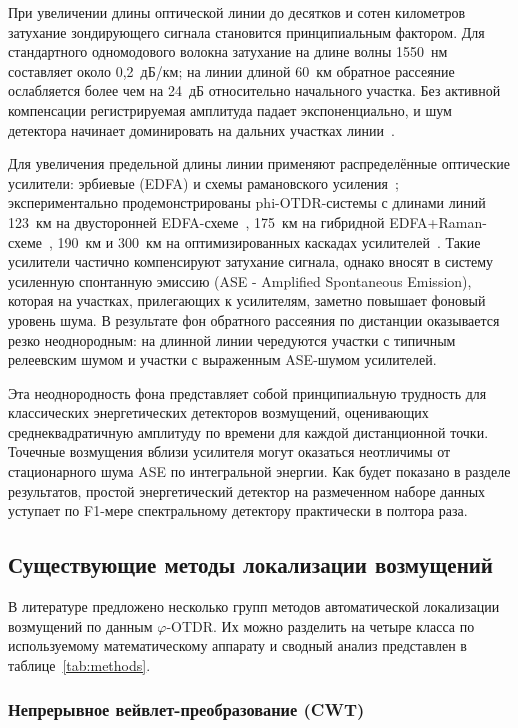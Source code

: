 \documentclass[12pt,a4paper]{extarticle}
\newcommand{\phiOTDR}{$\varphi$-OTDR}
\begin{document}
При увеличении длины оптической линии до десятков и сотен километров затухание зондирующего сигнала становится принципиальным фактором. Для стандартного одномодового волокна затухание на длине волны 1550~нм составляет около 0{,}2~дБ/км; на линии длиной 60~км обратное рассеяние ослабляется более чем на 24~дБ относительно начального участка. Без активной компенсации регистрируемая амплитуда падает экспоненциально, и шум детектора начинает доминировать на дальних участках линии~\cite{Peng2014, WangZN2014}.

Для увеличения предельной длины линии применяют распределённые оптические усилители: эрбиевые (EDFA) и схемы рамановского усиления~\cite{Martins2014, Wang2016}; экспериментально продемонстрированы phi-OTDR-системы с длинами линий 123~км на двусторонней EDFA-схеме~\cite{Tian2016}, 175~км на гибридной EDFA+Raman-схеме~\cite{WangZN2014}, 190~км и 300~км на оптимизированных каскадах усилителей~\cite{Wang2023, Fan2023}. Такие усилители частично компенсируют затухание сигнала, однако вносят в систему усиленную спонтанную эмиссию (ASE - Amplified Spontaneous Emission), которая на участках, прилегающих к усилителям, заметно повышает фоновый уровень шума. В результате фон обратного рассеяния по дистанции оказывается резко неоднородным: на длинной линии чередуются участки с типичным релеевским шумом и участки с выраженным ASE-шумом усилителей.

Эта неоднородность фона представляет собой принципиальную трудность для классических энергетических детекторов возмущений, оценивающих среднеквадратичную амплитуду по времени для каждой дистанционной точки. Точечные возмущения вблизи усилителя могут оказаться неотличимы от стационарного шума ASE по интегральной энергии. Как будет показано в разделе результатов, простой энергетический детектор на размеченном наборе данных уступает по F1-мере спектральному детектору практически в полтора раза.

\subsection{Существующие методы локализации возмущений}
\label{sec:existing}

В литературе предложено несколько групп методов автоматической локализации возмущений по данным \phiOTDR. Их можно разделить на четыре класса по используемому математическому аппарату и сводный анализ представлен в таблице~\ref{tab:methods}.

\subsubsection*{Непрерывное вейвлет-преобразование (CWT)}
\end{document}
